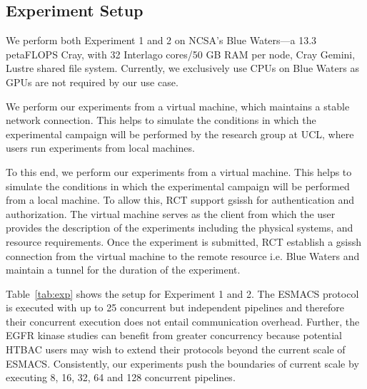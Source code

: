 \documentclass{bmcart}
\begin{document}
\subsection{Experiment Setup}\label{ssec:exp_setup}

We perform both Experiment 1 and 2 on NCSA's Blue Waters---a 13.3 petaFLOPS
Cray, with 32 Interlago cores/50 GB RAM per node, Cray Gemini, Lustre shared
file system. Currently, we exclusively use CPUs on Blue Waters as GPUs are
not required by our use case. 


We perform our experiments from a virtual machine, which maintains a stable network connection. This helps to simulate the conditions in which the experimental campaign will be performed by the research group at UCL\@, where users run experiments from local machines. 



To this end, we perform our experiments from a virtual machine. This
helps to simulate the conditions in which the experimental campaign will be
performed from a local machine. To allow this, RCT support \textmd{gsissh} for
authentication and authorization. The virtual machine serves as the client from 
which the user provides the description of the experiments including the physical systems, and resource requirements. Once the experiment is submitted, RCT establish a gsissh connection from the virtual machine to the remote resource i.e. Blue Waters and maintain a tunnel for the duration of the experiment. 

Table~\ref{tab:exp} shows the setup for Experiment 1 and 2. The ESMACS
protocol is executed with up to 25 concurrent but independent pipelines and
therefore their concurrent execution does not entail communication overhead.
Further, the EGFR kinase studies can benefit from greater concurrency because
potential HTBAC users may wish to extend their protocols beyond the current
scale of ESMACS\@. Consistently, our experiments push the boundaries of
current scale by executing 8, 16, 32, 64 and 128 concurrent pipelines.
\end{document}
